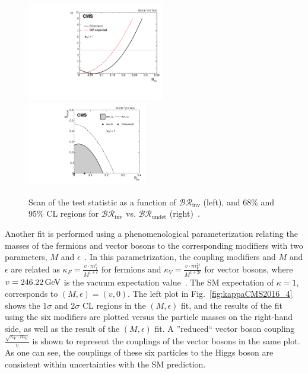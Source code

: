 \begin{figure}[!ht]
\begin{center}
\includegraphics[width=0.535\textwidth]{Fig/HIG17031/scan_pub_observed_K2Undet_BRinv}~
\includegraphics[width=0.465\textwidth]{Fig/HIG17031/plot_BRinvVsBRbsm_N4}\\
\caption{Scan of the test statistic as a function of $\mathcal{BR}_{\text{inv}}$ (left), and 68\% and 95\% CL regions for $\mathcal{BR}_{\text{inv}}$ vs. $\mathcal{BR}_{\text{undet}}$ (right)~\cite{CMS-PAS-HIG-17-031}. \label{fig:kappaCMS2016_3}}
\end{center}
\end{figure}

Another fit is performed using a phenomenological parameterization relating the masses of the fermions and vector bosons to the corresponding modifiers with two parameters, $M$ and $\epsilon$~\cite{Ellis:2012hz,Ellis:2013lra}. In this parametrization, the coupling modifiers and $M$ and $\epsilon$ are related as $\kappa_{F} = \frac{v\cdot m_{f}^{\epsilon}}{M^{1+\epsilon}}$ for fermions and $\kappa_{V} = \frac{v\cdot m_{V}^{2\epsilon}}{M^{1+2\epsilon}}$ for vector bosons, where $v = 246.22\,\text{Ge\hspace{-.08em}V}$ is the vacuum expectation value~\cite{Patrignani:2241948}. The SM expectation of $\kappa=1$, corresponds to $(M, \epsilon) = (v, 0)$. 
The left plot in Fig.~\ref{fig:kappaCMS2016_4} shows the $1\sigma$ and $2\sigma$ CL regions in the $(M,\epsilon)$ fit, and the results of the fit using the six modifiers are plotted versus the particle masses on the right-hand side, as well as the result of the $(M,\epsilon)$ fit. A ''reduced`` vector boson coupling $\frac{\sqrt{\kappa_{V}\cdot m_{V}}}{v}$ is shown to represent the couplings of the vector bosons in the same plot. As one can see, the couplings of these six particles to the Higgs boson are consistent within uncertainties with the SM prediction.

